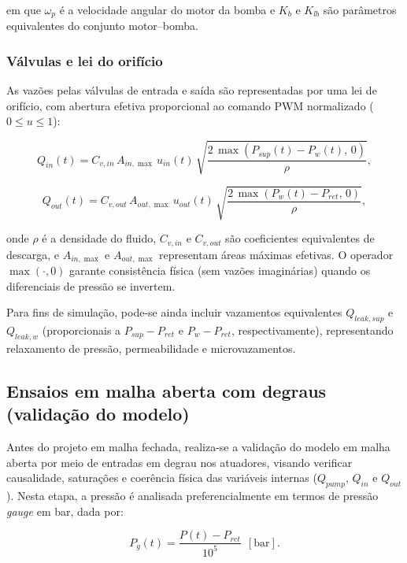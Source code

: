 em que $\omega_p$ é a velocidade angular do motor da bomba e $K_b$ e $K_{lb}$ são parâmetros equivalentes do conjunto motor--bomba.

\subsubsection{Válvulas e lei do orifício}
\label{sec:controle-valvulas-2p}

As vazões pelas válvulas de entrada e saída são representadas por uma lei de orifício, com abertura efetiva proporcional ao comando PWM normalizado ($0\leq u \leq 1$):

\begin{equation}
Q_{in}(t) = C_{v,in}\,A_{in,\max}\,u_{in}(t)\,\sqrt{\frac{2\,\max\left(P_{sup}(t)-P_w(t),\,0\right)}{\rho}},
\label{eq:qin_2p}
\end{equation}

\begin{equation}
Q_{out}(t) = C_{v,out}\,A_{out,\max}\,u_{out}(t)\,\sqrt{\frac{2\,\max\left(P_{w}(t)-P_{ret},\,0\right)}{\rho}},
\label{eq:qout_2p}
\end{equation}

onde $\rho$ é a densidade do fluido, $C_{v,in}$ e $C_{v,out}$ são coeficientes equivalentes de descarga, e $A_{in,\max}$ e $A_{out,\max}$ representam áreas máximas efetivas. O operador $\max(\cdot,0)$ garante consistência física (sem vazões imaginárias) quando os diferenciais de pressão se invertem.

Para fins de simulação, pode-se ainda incluir vazamentos equivalentes $Q_{leak,sup}$ e $Q_{leak,w}$ (proporcionais a $P_{sup}-P_{ret}$ e $P_w-P_{ret}$, respectivamente), representando relaxamento de pressão, permeabilidade e microvazamentos.

\subsection{Ensaios em malha aberta com degraus (validação do modelo)}
\label{sec:controle-ensaio-malha-aberta}

Antes do projeto em malha fechada, realiza-se a validação do modelo em malha aberta por meio de entradas em degrau nos atuadores, visando verificar causalidade, saturações e coerência física das variáveis internas ($Q_{pump}$, $Q_{in}$ e $Q_{out}$). Nesta etapa, a pressão é analisada preferencialmente em termos de pressão \textit{gauge} em bar, dada por:

\begin{equation}
P_{g}(t) = \frac{P(t)-P_{ret}}{10^5}\ \ [\text{bar}].
\label{eq:pressao_gauge_bar}
\end{equation}

